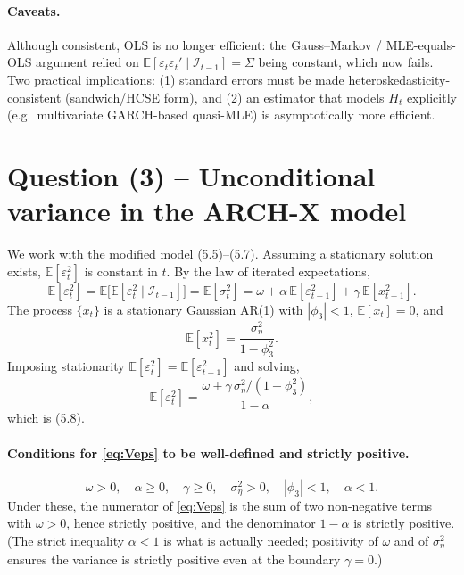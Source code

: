 \documentclass[12pt]{article}
\newcommand{\E}{\mathbb{E}}
\newcommand{\Info}{\mathcal{I}}
\begin{document}
\paragraph{Caveats.} Although consistent, OLS is no longer efficient: the Gauss--Markov / MLE-equals-OLS argument relied on $\E[\varepsilon_t\varepsilon_t'\mid\Info_{t-1}]=\Sigma$ being constant, which now fails. Two practical implications: (1) standard errors must be made heteroskedasticity-consistent (sandwich/HCSE form), and (2) an estimator that models $H_t$ explicitly (e.g.\ multivariate GARCH-based quasi-MLE) is asymptotically more efficient.

\section*{Question (3) -- Unconditional variance in the ARCH-X model}

We work with the modified model (5.5)--(5.7). Assuming a stationary solution exists, $\E[\varepsilon_t^2]$ is constant in $t$. By the law of iterated expectations,
\begin{equation*}
\E[\varepsilon_t^2]
= \E\!\big[\E[\varepsilon_t^2\mid\Info_{t-1}]\big]
= \E[\sigma_t^2]
= \omega + \alpha\,\E[\varepsilon_{t-1}^2] + \gamma\,\E[x_{t-1}^2].
\end{equation*}
The process $\{x_t\}$ is a stationary Gaussian AR(1) with $|\phi_3|<1$, $\E[x_t]=0$, and
\begin{equation}
\E[x_t^2] = \frac{\sigma_\eta^2}{1-\phi_3^2}.\label{eq:Vx}
\end{equation}
Imposing stationarity $\E[\varepsilon_t^2]=\E[\varepsilon_{t-1}^2]$ and solving,
\begin{equation}
\E[\varepsilon_t^2] = \frac{\omega+\gamma\,\sigma_\eta^2/(1-\phi_3^2)}{1-\alpha},\label{eq:Veps}
\end{equation}
which is (5.8).

\paragraph{Conditions for \eqref{eq:Veps} to be well-defined and strictly positive.}
\begin{equation*}
\omega>0,\quad \alpha\geq 0,\quad \gamma\geq 0,\quad \sigma_\eta^2>0,\quad |\phi_3|<1,\quad \alpha<1.
\end{equation*}
Under these, the numerator of \eqref{eq:Veps} is the sum of two non-negative terms with $\omega>0$, hence strictly positive, and the denominator $1-\alpha$ is strictly positive. (The strict inequality $\alpha<1$ is what is actually needed; positivity of $\omega$ and of $\sigma_\eta^2$ ensures the variance is strictly positive even at the boundary $\gamma=0$.)
\end{document}
